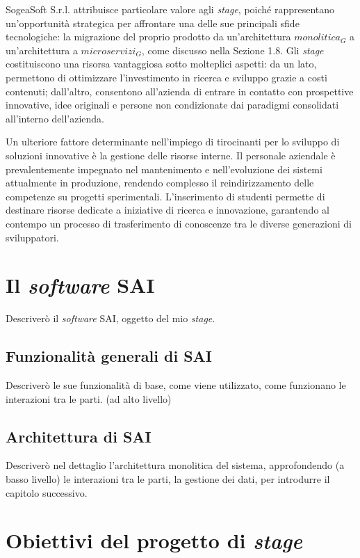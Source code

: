     \vspace{0.2 em}
    \noindent SogeaSoft S.r.l. attribuisce particolare valore agli \textit{stage}, poiché rappresentano un'opportunità strategica per affrontare una delle sue principali sfide tecnologiche: la migrazione del proprio prodotto da un’architettura $monolitica_G$ a un’architettura a $microservizi_G$, come discusso nella Sezione 1.8. Gli \textit{stage} costituiscono una risorsa vantaggiosa sotto molteplici aspetti: da un lato, permettono di ottimizzare l’investimento in ricerca e sviluppo grazie a costi contenuti; dall’altro, consentono all’azienda di entrare in contatto con prospettive innovative, idee originali e persone non condizionate dai paradigmi consolidati all'interno dell’azienda.  

    \vspace{0.2 em}
    \noindent Un ulteriore fattore determinante nell’impiego di tirocinanti per lo sviluppo di soluzioni innovative è la gestione delle risorse interne. Il personale aziendale è prevalentemente impegnato nel mantenimento e nell’evoluzione dei sistemi attualmente in produzione, rendendo complesso il reindirizzamento delle competenze su progetti sperimentali. L’inserimento di studenti permette di destinare risorse dedicate a iniziative di ricerca e innovazione, garantendo al contempo un processo di trasferimento di conoscenze tra le diverse generazioni di sviluppatori.
    
    \section{Il \textit{software} SAI}
    Descriverò il \textit{software} SAI, oggetto del mio \textit{stage}.
        \subsection{Funzionalità generali di SAI}
        Descriverò le sue funzionalità di base, come viene utilizzato, come funzionano le interazioni tra le parti. (ad alto livello)
        \subsection{Architettura di SAI}
        Descriverò nel dettaglio l'architettura monolitica del sistema, approfondendo (a basso livello) le interazioni tra le parti, la gestione dei dati, per introdurre il capitolo successivo.
    \section{Obiettivi del progetto di \textit{stage}}
